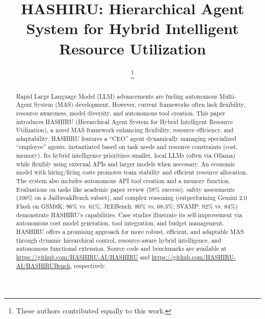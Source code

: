 \documentclass[conference]{IEEEtran}
\begin{document}
\title{HASHIRU: Hierarchical Agent System for Hybrid Intelligent Resource Utilization}

\author{
  \and
  \and
  \thanks{These authors contributed equally to this work.}
}
\maketitle
\begin{abstract}
Rapid Large Language Model (LLM) advancements are fueling autonomous Multi-Agent System (MAS) development. However, current frameworks often lack flexibility, resource awareness, model diversity, and autonomous tool creation. This paper introduces HASHIRU (Hierarchical Agent System for Hybrid Intelligent Resource Utilization), a novel MAS framework enhancing flexibility, resource efficiency, and adaptability. HASHIRU features a ``CEO'' agent dynamically managing specialized ``employee'' agents, instantiated based on task needs and resource constraints (cost, memory). Its hybrid intelligence prioritizes smaller, local LLMs (often via Ollama) while flexibly using external APIs and larger models when necessary. An economic model with hiring/firing costs promotes team stability and efficient resource allocation. The system also includes autonomous API tool creation and a memory function. Evaluations on tasks like academic paper review (58\% success), safety assessments (100\% on a JailbreakBench subset), and complex reasoning (outperforming Gemini 2.0 Flash on GSM8K: 96\% vs. 61\%; JEEBench: 80\% vs. 68.3\%; SVAMP: 92\% vs. 84\%) demonstrate HASHIRU's capabilities. Case studies illustrate its self-improvement via autonomous cost model generation, tool integration, and budget management. HASHIRU offers a promising approach for more robust, efficient, and adaptable MAS through dynamic hierarchical control, resource-aware hybrid intelligence, and autonomous functional extension. Source code and benchmarks are available at \url{https://github.com/HASHIRU-AI/HASHIRU} and \url{https://github.com/HASHIRU-AI/HASHIRUBench}, respectively.
\end{abstract}
\end{document}
